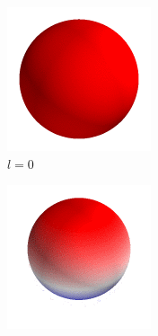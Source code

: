 \begin{figure}[tb]
    \raggedleft
    \begin{subfigure}[b]{0.25\linewidth}
        \includegraphics[width=\linewidth]{figures/spherical_harmonics/0_0.png}
        \caption*{$l=0$}
    \end{subfigure}%
    \begin{subfigure}[b]{0.25\linewidth}
        \includegraphics[width=\linewidth]{figures/spherical_harmonics/1_0.png}

\end{subfigure}
\end{figure}
